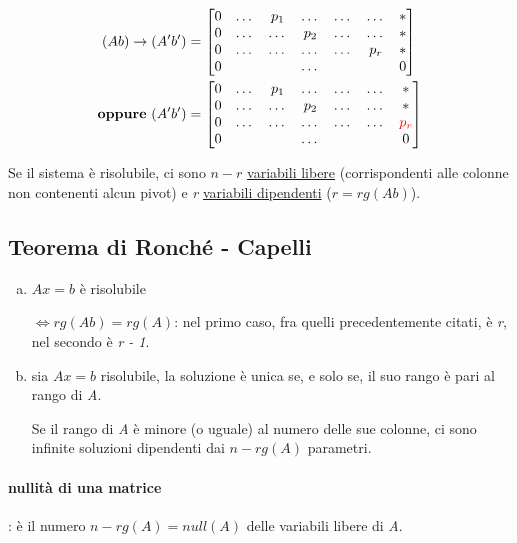 		\begin{align}
		(Ab) \rightarrow (A'b') & =
		\begin{bmatrix}
			0 & \dots & p_1 & \dots & \dots & \dots & * \\
			0 & \dots & \dots & p_2 & \dots & \dots & * \\
			0 & \dots & \dots & \dots & \dots & p_r & * \\
			0 &  &  & \dots &  &  & 0  
		\end{bmatrix} \notag \\
		\text{\textbf{oppure} } (A'b') & = 
		\begin{bmatrix}
			0 & \dots & p_1 & \dots & \dots & \dots & * \\
			0 & \dots & \dots & p_2 & \dots & \dots & * \\
			0 & \dots & \dots & \dots & \dots & \dots & \color{red} p_r \\
			0 &  &  & \dots &  &  & 0  
		\end{bmatrix} \notag
		\end{align}
		
		Se il sistema è risolubile, ci sono $n-r$ \underline{variabili libere} (corrispondenti alle colonne non contenenti alcun pivot) e \textit{r} \underline{variabili dipendenti} ($ r = rg (Ab) $).
		
		\subsection{Teorema di Ronché - Capelli}
			\begin{enumerate}[(a)]
				\item $ Ax = b $ è risolubile 
				
				$ \iff rg (Ab) = rg (A) $: nel primo caso, fra quelli precedentemente citati, è \textit{r}, nel secondo è \textit{r - 1}.
				\item sia $ Ax = b $ risolubile, la soluzione è unica se, e solo se, il suo rango è pari al rango di \textit{A}.
				
				Se il rango di \textit{A} è minore (o uguale) al numero delle sue colonne, ci sono infinite soluzioni dipendenti dai $ n - rg(A) $ parametri.
			\end{enumerate}
			\paragraph{nullità di una matrice}: è il numero $ n - rg(A) = null(A) $ delle variabili libere di \textit{A}.  
			
